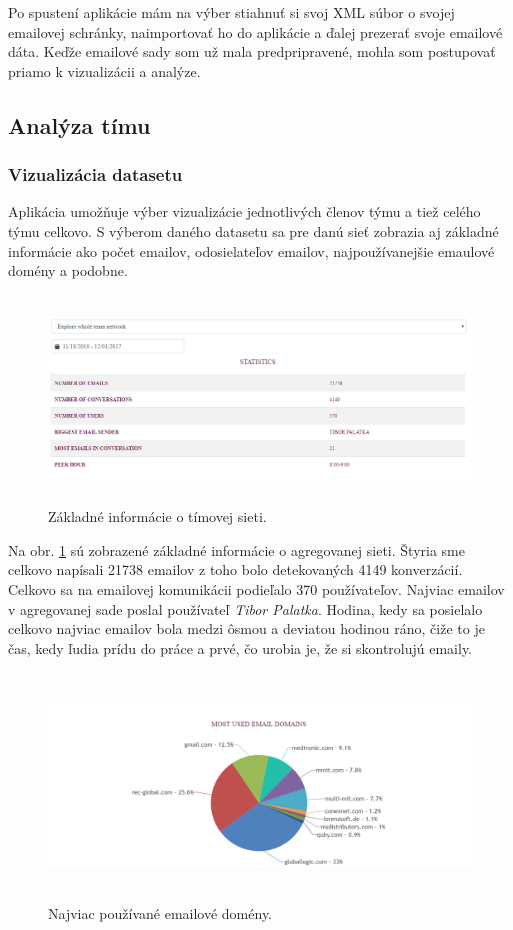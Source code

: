 \documentclass[slovak,master,public,dept460,male,cpdeclaration,oneside]{diploma}
\begin{document}
Po spustení aplikácie mám na výber stiahnuť si svoj XML súbor o svojej emailovej schránky, naimportovať ho do aplikácie a ďalej prezerať svoje emailové dáta. Keďže emailové sady som už mala predpripravené, mohla som postupovať priamo k vizualizácii a analýze.

\subsection{Analýza tímu}

\subsubsection{Vizualizácia datasetu}
Aplikácia umožňuje výber vizualizácie jednotlivých členov týmu a tiež celého týmu celkovo. S výberom daného datasetu sa pre danú sieť zobrazia aj základné informácie ako počet emailov, odosielateľov emailov, najpoužívanejšie emaulové domény a podobne.


\begin{figure}[H]
\centering
\includegraphics[width=14cm, height=5.5cm]{figures/team_tab_celkovo}
\caption{Základné informácie o tímovej sieti.}
\label{team_tab_celkovo}
\end{figure}

Na obr. \ref{team_tab_celkovo} sú zobrazené základné informácie o agregovanej sieti. Štyria sme celkovo napísali 21738 emailov z toho bolo detekovaných 4149 konverzácií. Celkovo sa na emailovej komunikácii podieľalo 370 používateľov. Najviac emailov v agregovanej sade poslal používateľ \textit{Tibor Palatka}. Hodina, kedy sa posielalo celkovo najviac emailov bola medzi ôsmou a deviatou hodinou ráno, čiže to je čas, kedy ľudia prídu do práce a prvé, čo urobia je, že si skontrolujú emaily. 

\begin{figure}[H]
\centering
\includegraphics[width=15cm, height=6cm]{figures/team_domain_celkovo}
\caption{Najviac používané emailové domény.}
\label{team_domain_celkovo}
\end{figure}
\end{document}
